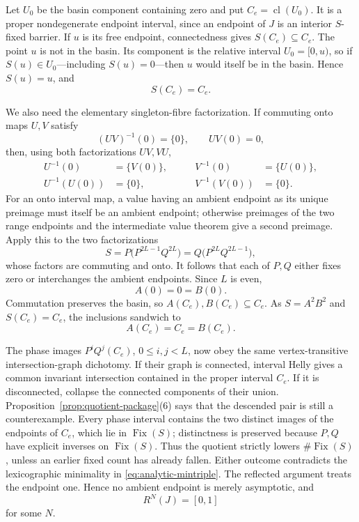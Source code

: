 \documentclass[11pt]{article}
\theoremstyle{definition}
\theoremstyle{remark}
\newcommand{\I}{[0,1]}
\newcommand{\Fix}{\operatorname{Fix}}
\newcommand{\cl}{\operatorname{cl}}
\begin{document}
Let \(U_0\) be the basin component containing zero and put
\(C_e=\cl(U_0)\).  It is a proper nondegenerate endpoint interval, since an
endpoint of \(J\) is an interior \(S\)-fixed barrier.  If \(u\) is its free
endpoint, connectedness gives \(S(C_e)\subseteq C_e\).  The point \(u\) is
not in the basin.  Its component is the relative interval
\(U_0=[0,u)\), so if \(S(u)\in U_0\)---including \(S(u)=0\)---then \(u\)
would itself be in the basin.  Hence \(S(u)=u\), and
\begin{equation}\label{eq:analytic-basin-onto}
 S(C_e)=C_e.
\end{equation}

We also need the elementary singleton-fibre factorization.  If commuting
onto maps \(U,V\) satisfy
\[
 (UV)^{-1}(0)=\{0\},\qquad UV(0)=0,
\]
then, using both factorizations \(UV,VU\),
\[
\begin{alignedat}{2}
 U^{-1}(0)&=\{V(0)\},\qquad&V^{-1}(0)&=\{U(0)\},\\
 U^{-1}(U(0))&=\{0\},&V^{-1}(V(0))&=\{0\}.
\end{alignedat}
\]
For an onto interval map, a value having an ambient endpoint as its unique
preimage must itself be an ambient endpoint; otherwise preimages of the two
range endpoints and the intermediate value theorem give a second preimage.
Apply this to the two factorizations
\[
 S=P\bigl(P^{2L-1}Q^{2L}\bigr)
  =Q\bigl(P^{2L}Q^{2L-1}\bigr),
\]
whose factors are commuting and onto.  It follows that each of \(P,Q\)
either fixes zero or interchanges the ambient endpoints.  Since \(L\) is even,
\[
 A(0)=0=B(0).
\]
Commutation preserves the basin, so \(A(C_e),B(C_e)\subseteq C_e\).  As
\(S=A^2B^2\) and \(S(C_e)=C_e\), the inclusions sandwich to
\[
 A(C_e)=C_e=B(C_e).
\]

The phase images \(P^iQ^j(C_e)\), \(0\leq i,j<L\), now obey the same
vertex-transitive intersection-graph dichotomy.  If their graph is
connected, interval Helly gives a common invariant intersection contained in
the proper interval \(C_e\).  If it is disconnected, collapse the connected
components of their union.  Proposition~\ref{prop:quotient-package}(6) says
that the descended pair is still a counterexample.  Every phase interval
contains the two distinct
images of the endpoints of \(C_e\), which lie in \(\Fix(S)\); distinctness
is preserved because \(P,Q\) have explicit inverses on \(\Fix(S)\).
Thus the quotient strictly lowers \(\#\Fix(S)\), unless an earlier fixed
count has already fallen.  Either outcome contradicts the lexicographic
minimality in \eqref{eq:analytic-mintriple}.  The reflected argument treats
the endpoint one.  Hence no ambient endpoint is merely asymptotic, and
\begin{equation}\label{eq:analytic-finite-arrival}
 R^N(J)=\I
\end{equation}
for some \(N\).
\end{document}
